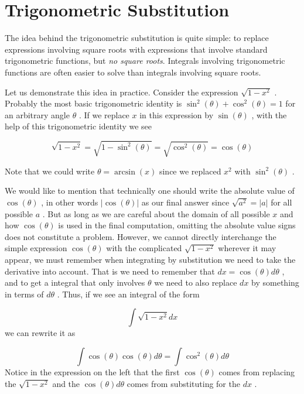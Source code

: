 \section{Trigonometric Substitution}
\label{sec:trigonometric-substitution}

The idea behind the trigonometric substitution is quite simple: to replace expressions involving square roots with expressions that involve standard trigonometric functions, but \textit{no square roots}. Integrals involving trigonometric functions are often easier to solve than integrals involving square roots.



Let us demonstrate this idea in practice. Consider the expression $\sqrt{1-x^2}$ . Probably the most basic trigonometric identity is $\sin^2(\theta)+\cos^2(\theta)=1$ for an arbitrary angle $\theta$ . If we replace $x$ in this expression by $\sin(\theta)$ , with the help of this trigonometric identity we see



$$\sqrt{1-x^2}=\sqrt{1-\sin^2(\theta)}=\sqrt{\cos^2(\theta)}=\cos(\theta)$$

Note that we could write $\theta=\arcsin(x)$ since we replaced $x^2$ with $\sin^2(\theta)$ .



We would like to mention that technically one should write the absolute value of $\cos(\theta)$ , in other words $\bigl|\cos(\theta)\bigr|$ as our final answer since $\sqrt{a^2}=|a|$ for all possible $a$ . But as long as we are careful about the domain of all possible $x$ and how $\cos(\theta)$ is used in the final computation, omitting the absolute value signs does not constitute a problem. However, we cannot directly interchange the simple expression $\cos(\theta)$ with the complicated $\sqrt{1-x^2}$ wherever it may appear, we must remember when integrating by substitution we need to take the derivative into account. That is we need to remember that $dx=\cos(\theta)d\theta$ , and to get a integral that only involves $\theta$ we need to also replace $dx$ by something in terms of $d\theta$ . Thus, if we see an integral of the form



$$\int\sqrt{1-x^2}dx$$ we can rewrite it as



$$\int\cos(\theta)\cos(\theta)d\theta=\int\cos^2(\theta)d\theta$$ Notice in the expression on the left that the first $\cos(\theta)$ comes from replacing the $\sqrt{1-x^2}$ and the $\cos(\theta)d\theta$ comes from substituting for the $dx$ .



